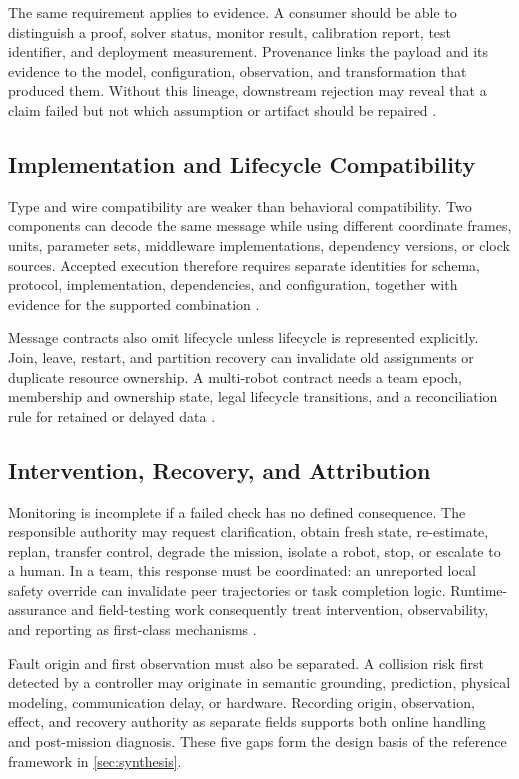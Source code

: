 The same requirement applies to evidence.  A consumer should be able to
distinguish a proof, solver status, monitor result, calibration report, test
identifier, and deployment measurement.  Provenance links the payload and its
evidence to the model, configuration, observation, and transformation that
produced them.  Without this lineage, downstream rejection may reveal that a
claim failed but not which assumption or artifact should be repaired
\cite{kim2026safeembodied,w3c2013prov}.

\subsection{Implementation and Lifecycle Compatibility}

Type and wire compatibility are weaker than behavioral compatibility.  Two
components can decode the same message while using different coordinate frames,
units, parameter sets, middleware implementations, dependency versions, or
clock sources.  Accepted execution therefore requires separate identities for
schema, protocol, implementation, dependencies, and configuration, together
with evidence for the supported combination
\cite{macenski2022ros2,omg2015dds,kronauer2021latency}.

Message contracts also omit lifecycle unless lifecycle is represented
explicitly.  Join, leave, restart, and partition recovery can invalidate old
assignments or duplicate resource ownership.  A multi-robot contract needs a
team epoch, membership and ownership state, legal lifecycle transitions, and a
reconciliation rule for retained or delayed data
\cite{luckcuck2026compositional,liu2026phyagentos}.

\subsection{Intervention, Recovery, and Attribution}

Monitoring is incomplete if a failed check has no defined consequence.  The
responsible authority may request clarification, obtain fresh state, re-estimate,
replan, transfer control, degrade the mission, isolate a robot, stop, or escalate
to a human.  In a team, this response must be coordinated: an unreported local
safety override can invalidate peer trajectories or task completion logic.
Runtime-assurance and field-testing work consequently treat intervention,
observability, and reporting as first-class mechanisms
\cite{desai2019soter,shivakumar2020soterros,caldas2024rvft}.

Fault origin and first observation must also be separated.  A collision risk
first detected by a controller may originate in semantic grounding, prediction,
physical modeling, communication delay, or hardware.  Recording origin,
observation, effect, and recovery authority as separate fields supports both
online handling and post-mission diagnosis.  These five gaps form the design
basis of the reference framework in \cref{sec:synthesis}.
